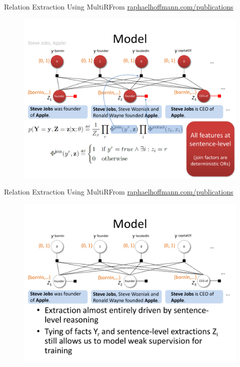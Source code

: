 \documentclass{beamer}
\begin{document}
\begin{frame}{Relation Extraction Using MultiR}{From \url{raphaelhoffmann.com/publications}}
\begin{figure}[h]
 \centering
 \includegraphics[scale=0.40]{./imgs/multirmode1.pdf}
 \end{figure}
\end{frame}
\begin{frame}{Relation Extraction Using MultiR}{From \url{raphaelhoffmann.com/publications}}
\begin{figure}[h]
 \centering
 \includegraphics[scale=0.40]{./imgs/multirmode2.pdf}
 \end{figure}
\end{frame}
\end{document}
